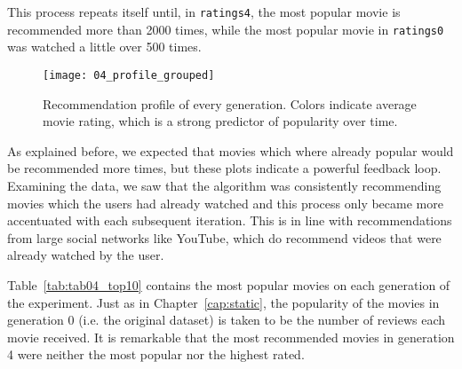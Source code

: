 This process repeats itself until, in \verb|ratings4|, the most popular movie is
recommended more than 2000 times, while the most popular movie in
\verb|ratings0| was watched a little over 500 times.

\begin{figure}
  \centering
  \texttt{[image: 04\_profile\_grouped]}
  \caption{Recommendation profile of every generation. Colors indicate average
  movie rating, which is a strong predictor of popularity over time.
  \label{fig:fig04_profile_grouped}}
\end{figure}

As explained before, we expected that movies which where already popular would
be recommended more times, but these plots indicate a powerful feedback loop.
Examining the data, we saw that the algorithm was consistently recommending
movies which the users had already watched and this process only became more
accentuated with each subsequent iteration. This is in line with recommendations
from large social networks like YouTube, which do recommend videos that were
already watched by the user.

Table~\ref{tab:tab04_top10} contains the most popular movies on each generation
of the experiment. Just as in Chapter~\ref{cap:static}, the popularity of the
movies in generation 0 (i.e. the original dataset) is taken to be the number of
reviews each movie received. It is remarkable that the most recommended movies
in generation 4 were neither the most popular nor the highest rated.

